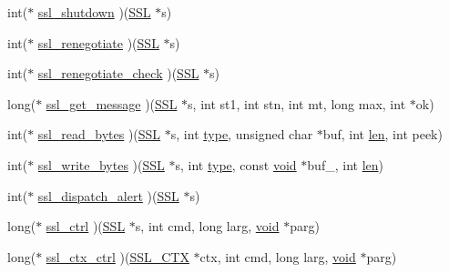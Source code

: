 \begin{DoxyCompactItemize}
\item 
int($\ast$ \hyperlink{structssl__method__st_ae7da0e04c68fbcc5077e749456b796b2}{ssl\+\_\+shutdown} )(\hyperlink{crypto_2ossl__typ_8h_a71f21e09bf365489dab9d85bd4785e24}{S\+SL} $\ast$s)
\item 
int($\ast$ \hyperlink{structssl__method__st_ab9b41c9a1970365d6071c2e32715a38d}{ssl\+\_\+renegotiate} )(\hyperlink{crypto_2ossl__typ_8h_a71f21e09bf365489dab9d85bd4785e24}{S\+SL} $\ast$s)
\item 
int($\ast$ \hyperlink{structssl__method__st_a0e0d93a372aef1cdb72ec025a2a9ec6b}{ssl\+\_\+renegotiate\+\_\+check} )(\hyperlink{crypto_2ossl__typ_8h_a71f21e09bf365489dab9d85bd4785e24}{S\+SL} $\ast$s)
\item 
long($\ast$ \hyperlink{structssl__method__st_a05dd06794630d13d8728503772dfa9b4}{ssl\+\_\+get\+\_\+message} )(\hyperlink{crypto_2ossl__typ_8h_a71f21e09bf365489dab9d85bd4785e24}{S\+SL} $\ast$s, int st1, int stn, int mt, long max, int $\ast$ok)
\item 
int($\ast$ \hyperlink{structssl__method__st_a82ffd609a31476eb45648bdebd1b3318}{ssl\+\_\+read\+\_\+bytes} )(\hyperlink{crypto_2ossl__typ_8h_a71f21e09bf365489dab9d85bd4785e24}{S\+SL} $\ast$s, int \hyperlink{include_2openssl_2x509_8h_ab512b8f495325c7ea0f5a5a5d3f938eb}{type}, unsigned char $\ast$buf, int \hyperlink{include_2openssl_2x509_8h_ad8c3db4434e9cb5cd772cc009f40e856}{len}, int peek)
\item 
int($\ast$ \hyperlink{structssl__method__st_a0409273ba5f2ca5e607bb5afe49e60d5}{ssl\+\_\+write\+\_\+bytes} )(\hyperlink{crypto_2ossl__typ_8h_a71f21e09bf365489dab9d85bd4785e24}{S\+SL} $\ast$s, int \hyperlink{include_2openssl_2x509_8h_ab512b8f495325c7ea0f5a5a5d3f938eb}{type}, const \hyperlink{hw__4758__cca_8h_afad4d591c7931ff6dc5bf69c76c96aa0}{void} $\ast$buf\+\_\+, int \hyperlink{include_2openssl_2x509_8h_ad8c3db4434e9cb5cd772cc009f40e856}{len})
\item 
int($\ast$ \hyperlink{structssl__method__st_a7039177b3912cb9d5805ea781dedcf0d}{ssl\+\_\+dispatch\+\_\+alert} )(\hyperlink{crypto_2ossl__typ_8h_a71f21e09bf365489dab9d85bd4785e24}{S\+SL} $\ast$s)
\item 
long($\ast$ \hyperlink{structssl__method__st_a0b2b4d082aa633a74696197d5a9725de}{ssl\+\_\+ctrl} )(\hyperlink{crypto_2ossl__typ_8h_a71f21e09bf365489dab9d85bd4785e24}{S\+SL} $\ast$s, int cmd, long larg, \hyperlink{hw__4758__cca_8h_afad4d591c7931ff6dc5bf69c76c96aa0}{void} $\ast$parg)
\item 
long($\ast$ \hyperlink{structssl__method__st_a695737964e2f49cf0007c3815273b1b3}{ssl\+\_\+ctx\+\_\+ctrl} )(\hyperlink{crypto_2ossl__typ_8h_a1a21892c1193ee6eb572c2c72d3924ca}{S\+S\+L\+\_\+\+C\+TX} $\ast$ctx, int cmd, long larg, \hyperlink{hw__4758__cca_8h_afad4d591c7931ff6dc5bf69c76c96aa0}{void} $\ast$parg)

\end{DoxyCompactItemize}
